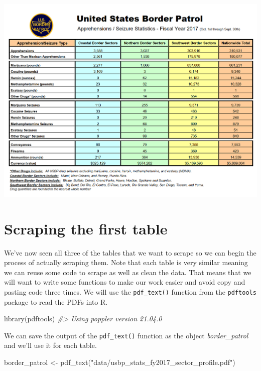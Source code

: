 \documentclass[
]{krantz}
\makeatletter
\newenvironment{Shaded}{\begin{snugshade}}{\end{snugshade}}
\newcommand{\CommentTok}[1]{\textcolor[rgb]{0.37,0.37,0.37}{\textit{#1}}}
\newcommand{\FunctionTok}[1]{\textcolor[rgb]{0,0,0}{#1}}
\newcommand{\NormalTok}[1]{#1}
\newcommand{\OtherTok}[1]{\textcolor[rgb]{0.37,0.37,0.37}{#1}}
\newcommand{\StringTok}[1]{\textcolor[rgb]{0.5,0.5,0.5}{#1}}
\newenvironment{kframe}{%
\medskip{}
\setlength{\fboxsep}{.8em}
 \def\at@end@of@kframe{}%
 \ifinner\ifhmode%
  \def\at@end@of@kframe{\end{minipage}}%
  \begin{minipage}{\columnwidth}%
 \fi\fi%
 \def\FrameCommand##1{\hskip\@totalleftmargin \hskip-\fboxsep
 \colorbox{shadecolor}{##1}\hskip-\fboxsep
     \hskip-\linewidth \hskip-\@totalleftmargin \hskip\columnwidth}%
 \MakeFramed {\advance\hsize-\width
   \@totalleftmargin\z@ \linewidth\hsize
   \@setminipage}}%
 {\par\unskip\endMakeFramed%
 \at@end@of@kframe}
\renewenvironment{Shaded}{\begin{kframe}}{\end{kframe}}
\makeatother
\begin{document}
\includegraphics{images/pdf_table_4.PNG}

\hypertarget{scraping-the-first-table}{%
\section{Scraping the first table}\label{scraping-the-first-table}}

We've now seen all three of the tables that we want to scrape so we can begin the process of actually scraping them. Note that each table is very similar meaning we can reuse some code to scrape as well as clean the data. That means that we will want to write some functions to make our work easier and avoid copy and pasting code three times. We will use the \texttt{pdf\_text()} function from the \texttt{pdftools} package to read the PDFs into R.

\begin{Shaded}
\begin{Highlighting}[]
\FunctionTok{library}\NormalTok{(pdftools)}
\CommentTok{\#\textgreater{} Using poppler version 21.04.0}
\end{Highlighting}
\end{Shaded}

We can save the output of the \texttt{pdf\_text()} function as the object \emph{border\_patrol} and we'll use it for each table.

\begin{Shaded}
\begin{Highlighting}[]
\NormalTok{border\_patrol }\OtherTok{\textless{}{-}} \FunctionTok{pdf\_text}\NormalTok{(}\StringTok{"data/usbp\_stats\_fy2017\_sector\_profile.pdf"}\NormalTok{)}
\end{Highlighting}
\end{Shaded}
\end{document}

